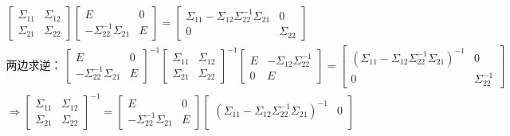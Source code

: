 \documentclass{article} %
\begin{document}
\[\begin{gathered}
\begin{bmatrix}
                \Sigma_{11} & \Sigma_{12}\\
                \Sigma_{21} & \Sigma_{22}
            \end{bmatrix}
            \begin{bmatrix}
                E & 0\\
                -\Sigma_{22}^{-1}\Sigma_{21} & E
            \end{bmatrix}=
            \begin{bmatrix}
                \Sigma_{11}-\Sigma_{12}\Sigma_{22}^{-1}\Sigma_{21} & 0\\
                0 & \Sigma_{22}
            \end{bmatrix}\\
            \text{两边求逆：}  \,
            \begin{bmatrix}
                E & 0\\
                -\Sigma_{22}^{-1}\Sigma_{21} & E
            \end{bmatrix}^{-1}
            \begin{bmatrix}
                \Sigma_{11} & \Sigma_{12}\\
                \Sigma_{21} & \Sigma_{22}
            \end{bmatrix}^{-1}
            \begin{bmatrix}
                E & -\Sigma_{12}\Sigma_{22}^{-1}\\
                0 & E
            \end{bmatrix}=
            \begin{bmatrix}
                \left(\Sigma_{11}-\Sigma_{12}\Sigma_{22}^{-1}\Sigma_{21}\right)^{-1} & 0\\
                0 & \Sigma_{22}^{-1}
            \end{bmatrix}\\
            \Rightarrow
            \begin{bmatrix}
                \Sigma_{11} & \Sigma_{12}\\
                \Sigma_{21} & \Sigma_{22}
            \end{bmatrix}^{-1}=
            \begin{bmatrix}
                E & 0\\
                -\Sigma_{22}^{-1}\Sigma_{21} & E
            \end{bmatrix}
            \begin{bmatrix}
                \left(\Sigma_{11}-\Sigma_{12}\Sigma_{22}^{-1}\Sigma_{21}\right)^{-1} & 0\\

\end{bmatrix}
\end{gathered}\]
\end{document}
